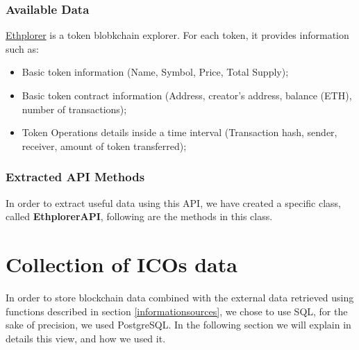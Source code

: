 \subsubsection{Available Data}
\href{https://ethplorer.io/}{Ethplorer} is a token blobkchain explorer. For each token, it provides information such as:
\begin{itemize}
    \item Basic token information (Name, Symbol, Price, Total Supply);
    \item Basic token contract information (Address, creator's address, balance (ETH), number of transactions);
    \item Token Operations details inside a time interval (Transaction hash, sender, receiver, amount of token transferred);
\end{itemize}
\subsubsection{Extracted API Methods}
In order to extract useful data using this API, we have created a specific class, called \textbf{EthplorerAPI}, following are the methods in this class.


\section{Collection of ICOs data}
In order to store blockchain data combined with the external data retrieved using functions described in section \ref{informationsources}, we chose to use SQL, for the sake of precision, we used PostgreSQL.
In the following section we will explain in details this view, and how we used it.

